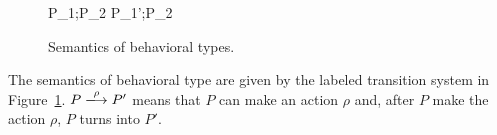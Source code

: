 


\begin{figure}[t]

\begin{minipage}[t]{0.25\textwidth}
\end{minipage}
\begin{minipage}[t]{0.34\textwidth}
\end{minipage}
\begin{minipage}[t]{0.3\textwidth}
\end{minipage}

\vspace{2mm}

\begin{minipage}{0.33\textwidth}
\end{minipage}
\begin{minipage}{0.3\textwidth}
\end{minipage}
\begin{minipage}{0.33\textwidth}
\end{minipage}

{P_{1};P_{2} \xlongrightarrow{\rho} P_{1}';P_{2}}

\caption{Semantics of behavioral types.}
\label{fig:semBTypes}
\end{figure}


The semantics of behavioral type are given by the labeled transition
system in Figure~\ref{fig:semBTypes}.  \(P \xlongrightarrow{\rho} P'\)
means that \(P\) can make an action \(\rho\) and, after \(P\) make the
action \(\rho\), \(P\) turns into \(P'\).

